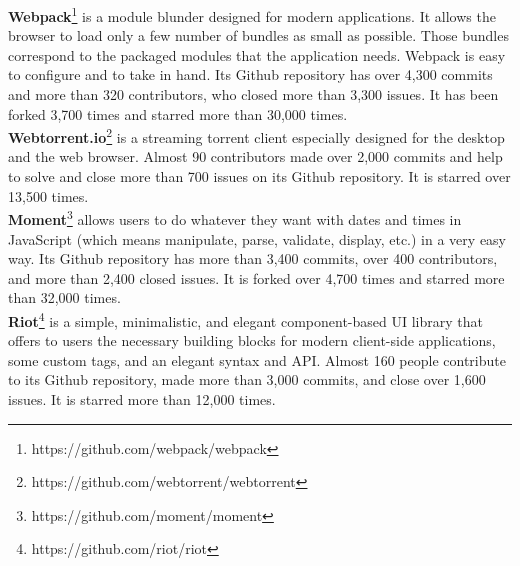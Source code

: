 {\textbf{Webpack}\footnote{https://github.com/webpack/webpack} is a module blunder designed for modern applications. It allows the browser to load only a few number of bundles as small as possible. Those bundles correspond to the packaged modules that the application needs. Webpack is easy to configure and to take in hand. Its Github repository has over 4,300 commits and more than 320 contributors, who closed more than 3,300 issues. It has been forked 3,700 times and starred more than 30,000 times.\\
\textbf{Webtorrent.io}\footnote{https://github.com/webtorrent/webtorrent} is a streaming torrent client especially designed for the desktop and the web browser. Almost 90 contributors made over 2,000 commits and help to solve and close more than 700 issues on its Github repository. It is starred over 13,500 times.\\
\textbf{Moment}\footnote{https://github.com/moment/moment} allows users to do whatever they want with dates and times in Java\-Script (which means manipulate, parse, validate, display, etc.) in a very easy way. Its Github repository has more than 3,400 commits, over 400 contributors, and more than 2,400 closed issues. It is forked over 4,700 times and starred more than 32,000 times.\\
\textbf{Riot}\footnote{https://github.com/riot/riot} is a simple, minimalistic, and elegant component-based UI library that offers to users the necessary building blocks for modern client-side applications, some custom tags, and an elegant syntax and API. Almost 160 people contribute to its Github repository, made more than 3,000 commits, and close over 1,600 issues. It is starred more than 12,000 times.
}
